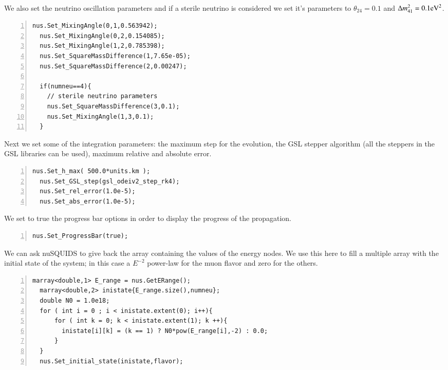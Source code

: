 \documentclass[3p,12pt]{elsarticle}
\newcommand{\ttf}{\ttfamily}
\begin{document}
We also set the neutrino oscillation parameters and if a sterile
neutrino is considered we set it's parameters to $\theta_{24}=0.1$ and
$\Delta m_{41}^2=0.1{\rm eV}^2$.
\begin{lstlisting}[frame=leftline, numbers = left,breaklines=true,label = ex:sin1,firstnumber=last]
  nus.Set_MixingAngle(0,1,0.563942);
  nus.Set_MixingAngle(0,2,0.154085);
  nus.Set_MixingAngle(1,2,0.785398);
  nus.Set_SquareMassDifference(1,7.65e-05);
  nus.Set_SquareMassDifference(2,0.00247);

  if(numneu==4){
    // sterile neutrino parameters
    nus.Set_SquareMassDifference(3,0.1);
    nus.Set_MixingAngle(1,3,0.1);
  }
\end{lstlisting}

Next we set some of the integration parameters: the maximum
step for the evolution,  the GSL stepper algorithm (all the steppers in
the GSL libraries can be used), maximum relative and absolute error.

\begin{lstlisting}[frame=leftline, numbers = left,breaklines=true,label = ex:sin1,firstnumber=last]
  nus.Set_h_max( 500.0*units.km );
  nus.Set_GSL_step(gsl_odeiv2_step_rk4);
  nus.Set_rel_error(1.0e-5);
  nus.Set_abs_error(1.0e-5);
\end{lstlisting}

We set to {\ttf true} the progress bar options in order to display the
progress of the propagation.

\begin{lstlisting}[frame=leftline, numbers = left,breaklines=true,label = ex:sin1,firstnumber=last]
  nus.Set_ProgressBar(true);
\end{lstlisting}

We can ask nuSQUIDS to give back the array containing the values of
the energy nodes. We use this here to fill a multiple array with the initial
state of the system; in this case a $E^{-2}$ power-law for the muon
flavor and zero for the others.
 
\begin{lstlisting}[frame=leftline, numbers = left,breaklines=true,label = ex:sin1,firstnumber=last]
  marray<double,1> E_range = nus.GetERange();
  marray<double,2> inistate{E_range.size(),numneu};
  double N0 = 1.0e18;
  for ( int i = 0 ; i < inistate.extent(0); i++){
      for ( int k = 0; k < inistate.extent(1); k ++){
        inistate[i][k] = (k == 1) ? N0*pow(E_range[i],-2) : 0.0;
      }
  }
  nus.Set_initial_state(inistate,flavor);
\end{lstlisting}
\end{document}
